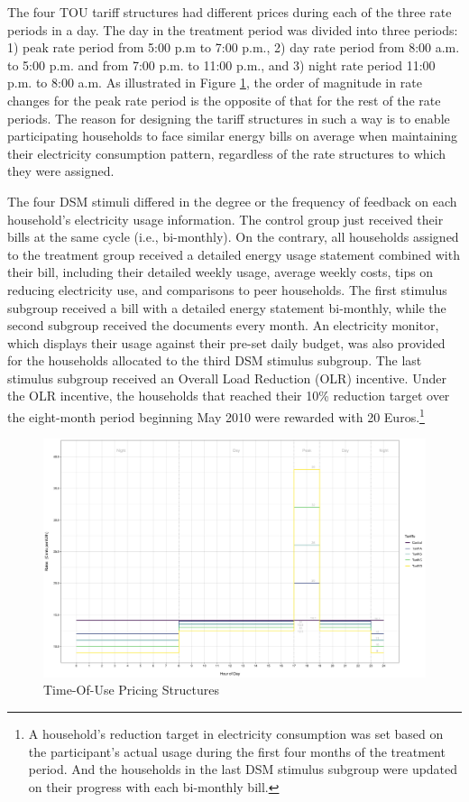 The four TOU tariff structures had different prices during each of the three rate periods in a day. The day in the treatment period was divided into three periods: 1) peak rate period from 5:00 p.m to 7:00 p.m., 2) day rate period from 8:00 a.m. to 5:00 p.m. and from 7:00 p.m. to 11:00 p.m., and 3) night rate period 11:00 p.m. to 8:00 a.m. As illustrated in Figure \ref{Figure:Time-Of-Use-Pricing-Structures}, the order of magnitude in rate changes for the peak rate period is the opposite of that for the rest of the rate periods. The reason for designing the tariff structures in such a way is to enable participating households to face similar energy bills on average when maintaining their electricity consumption pattern, regardless of the rate structures to which they were assigned. 

The four DSM stimuli differed in the degree or the frequency of feedback on each household's electricity usage information. The control group just received their bills at the same cycle (i.e., bi-monthly). On the contrary, all households assigned to the treatment group received a detailed energy usage statement combined with their bill, including their detailed weekly usage, average weekly costs, tips on reducing electricity use, and comparisons to peer households. The first stimulus subgroup received a bill with a detailed energy statement bi-monthly, while the second subgroup received the documents every month. An electricity monitor, which displays their usage against their pre-set daily budget, was also provided for the households allocated to the third DSM stimulus subgroup. The last stimulus subgroup received an Overall Load Reduction (OLR) incentive. Under the OLR incentive, the households that reached their 10\% reduction target over the eight-month period beginning May 2010 were rewarded with 20 Euros.\footnote{A household's reduction target in electricity consumption was set based on the participant's actual usage during the first four months of the treatment period. And the households in the last DSM stimulus subgroup were updated on their progress with each bi-monthly bill.}

\begin{figure}[!th]
\includegraphics[scale = 0.095]{03_Chapter-2/00A_Figures/Figure_Time-of-Use-Tariff-Structures}
\caption{Time-Of-Use Pricing Structures}
\label{Figure:Time-Of-Use-Pricing-Structures}
\end{figure}
